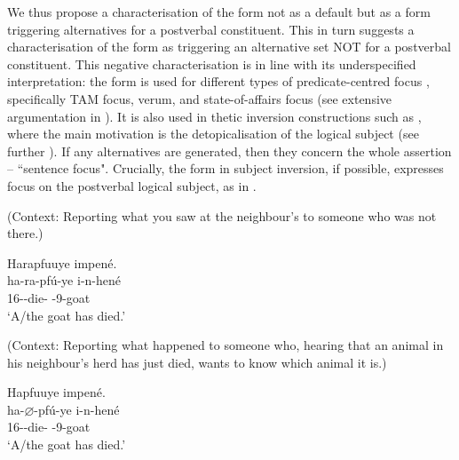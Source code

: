 \documentclass[output=paper]{langscibook}
\begin{document}
 \citep[403]{NshemezimanaBostoen2017}
\z

We thus propose a characterisation of the \CJ{} form not as a default but as a form triggering alternatives for a postverbal constituent. This in turn suggests a characterisation of the \DJ{} form as triggering an alternative set NOT for a postverbal constituent. This negative characterisation is in line with its underspecified interpretation: the \DJ{} form is used for different types of predicate-centred focus \citep{Güldemann2010}, specifically TAM focus, verum, and state-of-affairs focus (see extensive argumentation in \citealt{NshemezimanaBostoen2017}). It is also used in thetic inversion constructions such as , where the main motivation is the detopicalisation of the logical subject (see further ). If any alternatives are generated, then they concern the whole assertion –  ``sentence focus". Crucially, the \CJ{} form in subject inversion, if possible, expresses focus on the postverbal logical subject, as in .

\ea
\label{bkm:Ref76374640}
\ea
(Context: Reporting what you saw at the neighbour’s to someone who was not there.)\\
\begin{xlist}
\exi{\DJ{}}
Harapfuuye impené.\\
\gll
ha-ra-pfú-ye  i-n-hené\\
16\SM-\DJ{}-die-\PFV{}  \AUG{}-9-goat\\
\glt
‘A/the goat has died.’\\

\end{xlist}

\ex
\label{bkm:Ref78543650}
(Context: Reporting what happened to someone who, hearing that an animal in his neighbour’s herd has just died, wants to know which animal it is.)\\
\begin{xlist}
\exi{\CJ{}}
Hapfuuye impené.\\
\gll
ha-$\varnothing$-pfú-ye  i-n-hené\\
16\SM{}-\CJ{}-die-\PFV{}  \AUG{}-9-goat\\
\glt
‘A/the goat has died.’\\

\end{xlist}
\z
\z
\end{document}
